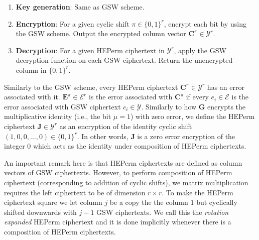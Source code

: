 \begin{enumerate}
    \item \textbf{Key generation}: Same as GSW scheme.
    \item \textbf{Encryption}: For a given cyclic shift $\pi \in \{0,1\}^r$, encrypt each bit by using the GSW scheme. Output the encrypted column vector $\mathbf{C}^{\pi} \in \mathcal{Y}^{r}$. 
    \item \textbf{Decryption}: For a given HEPerm ciphertext in $\mathcal{Y}^{r}$, apply the GSW decryption function on each GSW ciphertext. Return the unencrypted column in $\{0,1\}^r$.
\end{enumerate}
Similarly to the GSW scheme, every HEPerm ciphertext $\mathbf{C}^{\pi} \in \mathcal{Y}^{r}$ has an error associated with it. $\mathbf{E}^{\pi} \in \mathcal{E}^{r}$ is the error associated with $\mathbf{C}^{\pi}$ if every $e_{i} \in \mathcal{E}$ is the error associated with GSW ciphertext $c_{i} \in \mathcal{Y}$. Similarly to how $\mathbf{G}$ encrypts the multiplicative identity (i.e., the bit $\mu = 1$) with zero error, we define the HEPerm ciphertext $\mathbf{J} \in \mathcal{Y}^{r}$ as an encryption of the identity cyclic shift $(1, 0, 0, \dots, 0) \in \{0,1\}^{r}$. In other words, $\mathbf{J}$ is a zero error encryption of the integer $0$ which acts as the identity under composition of HEPerm ciphertexts.

An important remark here is that HEPerm ciphertexts are defined as column vectors of GSW ciphertexts. However, to perform composition of HEPerm ciphertext (corresponding to addition of cyclic shifts), we matrix multiplication requires the left ciphertext to be of dimension $r \times r$. To make the HEPerm ciphertext square we let column $j$ be a copy the the column $1$ but cyclically shifted downwards with $j-1$ GSW ciphertexts. We call this the \textit{rotation expanded} HEPerm ciphertext and it is done implicitly whenever there is a composition of HEPerm ciphertexts.

